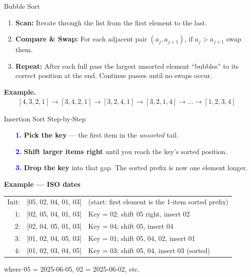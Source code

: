 \documentclass[aspectratio=169]{beamer}
\begin{document}
\begin{frame}[fragile]{Bubble Sort}
\vspace*{-0.5cm}
  \begin{enumerate}
    \item \textbf{Scan:}
      Iterate through the list from the first element to the last.
    \item \textbf{Compare \& Swap:}
      For each adjacent pair $(a_j,a_{j+1})$, if $a_j > a_{j+1}$ swap them.
    \item \textbf{Repeat:}
      After each full pass the largest unsorted element “bubbles” to its correct position at the end. Continue passes until no swaps occur.
  \end{enumerate}
  \textbf{Example.}
\[
\begin{array}{l}
[4,3,2,1] \to
[3,4,2,1] \to
[3,2,4,1] \to
[3,2,1,4] \to \dots \to
[1,2,3,4]
\end{array}
\]
\end{frame}


\begin{frame}
\vspace*{-2cm}
  \centering
\end{frame}


\begin{frame}{Insertion Sort Step-by-Step}
\setlength{\leftmargini}{1.2em}
\setlength{\itemsep}{0.2em}
\begin{itemize}
  \item[\textcolor{blue}{\bfseries 1.}] \textbf{Pick the key} — the first item in the \emph{unsorted} tail.
  \item[\textcolor{blue}{\bfseries 2.}] \textbf{Shift larger items right} until you reach the key’s sorted position.
  \item[\textcolor{blue}{\bfseries 3.}] \textbf{Drop the key} into that gap. The sorted prefix is now one element longer.
\end{itemize}

\vspace{1ex}
\textbf{Example — ISO dates}
\scriptsize
\begin{tabular}{rlp{6cm}}
Init: & {[05, 02, 04, 01, 03]} & (start: first element is the 1-item sorted prefix) \\
1: & {[02, 05, 04, 01, 03]} & Key = 02; shift 05 right, insert 02 \\
2: & {[02, 04, 05, 01, 03]} & Key = 04; shift 05, insert 04 \\
3: & {[01, 02, 04, 05, 03]} & Key = 01; shift 05, 04, 02, insert 01 \\
4: & {[01, 02, 03, 04, 05]} & Key = 03; shift 05, 04, insert 03 (sorted) \\
\end{tabular}

\vspace{0.5ex}
{\footnotesize where 05 = 2025-06-05, 02 = 2025-06-02, etc.}
\end{frame}
\end{document}
